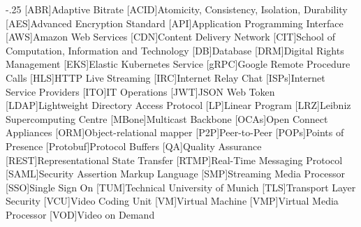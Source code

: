 \documentclass[headsepline,footsepline,footinclude=false,oneside,fontsize=11pt,paper=a4,listof=totoc,bibliography=totoc]{scrbook} %
\begin{document}


\frontmatter{}





\tableofcontents{}

\mainmatter{}






%





\appendix{}


\begin{acronym}
	\itemsep-.25\baselineskip
    [ABR]{Adaptive Bitrate}
    [ACID]{Atomicity, Consistency, Isolation, Durability}
    [AES]{Advanced Encryption Standard}
    [API]{Application Programming Interface}
    [AWS]{Amazon Web Services}
    [CDN]{Content Delivery Network}
    [CIT]{School of Computation, Information and Technology}
    [DB]{Database}
    [DRM]{Digital Rights Management}
    [EKS]{Elastic Kubernetes Service}
    [gRPC]{Google Remote Procedure Calls}
    [HLS]{HTTP Live Streaming}
    [IRC]{Internet Relay Chat}
    [ISPs]{Internet Service Providers}
    [ITO]{IT Operations}
    [JWT]{JSON Web Token}
    [LDAP]{Lightweight Directory Access Protocol}
    [LP]{Linear Program}
    [LRZ]{Leibniz Supercomputing Centre}
    [MBone]{Multicast Backbone}
    [OCAs]{Open Connect Appliances}
    [ORM]{Object-relational mapper}
    [P2P]{Peer-to-Peer}
    [POPs]{Points of Presence}
    [Protobuf]{Protocol Buffers}
    [QA]{Quality Assurance}
    [REST]{Representational State Transfer}
    [RTMP]{Real-Time Messaging Protocol}
    [SAML]{Security Assertion Markup Language}
    [SMP]{Streaming Media Processor}
    [SSO]{Single Sign On}
    [TUM]{Technical University of Munich}
    [TLS]{Transport Layer Security}
    [VCU]{Video Coding Unit}
    [VM]{Virtual Machine}
    [VMP]{Virtual Media Processor}
    [VOD]{Video on Demand}
    
\end{acronym}

\listoffigures{}
\listoftables{}
\printbibliography{}
\end{document}

